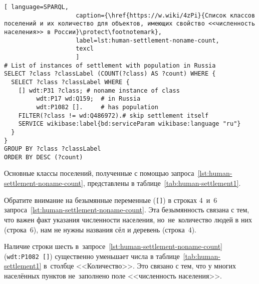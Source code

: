 \begin{lstlisting}[ language=SPARQL, 
                    caption={\href{https://w.wiki/4zPi}{Список классов поселений и их количество для объектов, имеющих свойство <<численность населения>> в России}\protect\footnotemark},
                    label=lst:human-settlement-noname-count,
                    texcl 
                    ]
# List of instances of settlement with population in Russia
SELECT ?class ?classLabel (COUNT(?class) AS ?count) WHERE {
  SELECT ?class ?classLabel WHERE {
    [] wdt:P31 ?class; # noname instance of class
         wdt:P17 wd:Q159;  # in Russia
         wdt:P1082 [].     # has population
    FILTER(?class != wd:Q486972).# skip settlement itself
    SERVICE wikibase:label{bd:serviceParam wikibase:language "ru"}
  }
}
GROUP BY ?class ?classLabel
ORDER BY DESC (?count)
\end{lstlisting}%

Основные классы поселений, полученные с помощью запроса~\ref{lst:human-settlement-noname-count}, 
представлены в таблице~\ref{tab:human-settlement1}. 

Обратите внимание на безымянные переменные (\lstinline|[]|) 
в строках 4~и~6 запроса~\ref{lst:human-settlement-noname-count}. 
Эта безымянность связана с тем, что 
важен факт указания численности населения, но~не~количество людей в них (строка~6),  
нам не нужны названия сёл и деревень (строка~4).  

Наличие строки шесть в~запросе~\ref{lst:human-settlement-noname-count} 
(\lstinline|wdt:P1082 []|) 
существенно уменьшает числа в таблице~\ref{tab:human-settlement1} 
в~столбце <<Количество>>. 
Это связано с тем, что у многих населённых пунктов 
не~заполнено поле <<численность населения>>. 



